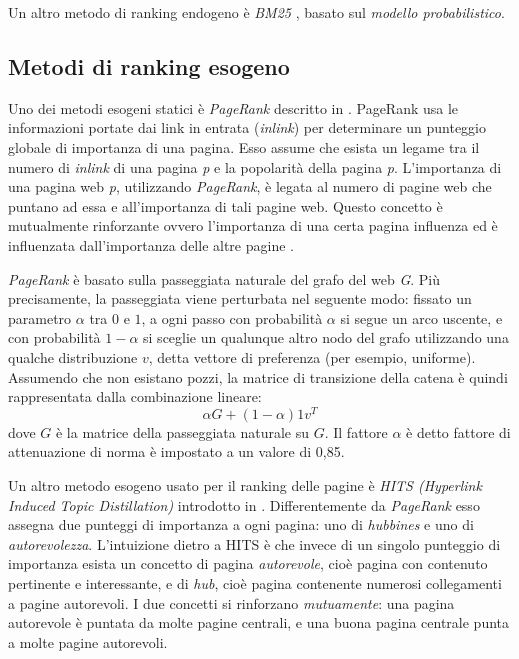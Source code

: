 Un altro metodo di ranking endogeno è \textit{BM25} \cite{Robertson:2009:PRF:1704809.1704810}, basato sul \textit{modello probabilistico}. 

\subsection{Metodi di ranking esogeno}
\label{sub:esogeno}
Uno dei metodi esogeni statici è \textit{PageRank} descritto in \cite{ilprints422}. PageRank usa le informazioni portate dai link in entrata (\textit{inlink}) per determinare un punteggio globale di importanza di una pagina. Esso assume che esista un legame tra il numero di \textit{inlink} di una pagina \textit{p} e la popolarità della pagina \textit{p}. L'importanza di una pagina web \textit{p}, utilizzando \textit{PageRank}, è legata al numero di pagine web che puntano ad essa e all'importanza di tali pagine web. Questo concetto è mutualmente rinforzante ovvero l'importanza di una certa pagina influenza ed è influenzata dall'importanza delle altre pagine \cite{ilprints646}. 

\textit{PageRank} è basato sulla passeggiata naturale del grafo del web \textit{G}. Più precisamente, la passeggiata viene perturbata nel seguente modo: fissato un parametro \(\alpha\) tra \(0\) e \(1\), a ogni passo con probabilità \(\alpha\) si segue un arco uscente, e con probabilità \(1- \alpha \) si sceglie un qualunque altro nodo del grafo utilizzando 
una 
qualche 
distribuzione \(v\), detta
vettore di preferenza (per esempio, uniforme). Assumendo che non esistano pozzi, la matrice di transizione della catena è quindi rappresentata dalla combinazione lineare:
\begin{equation}
 \alpha G + (1 - \alpha) 1 v^T
\end{equation}
dove \(G\) è la matrice della passeggiata naturale su \(G\). Il fattore \(\alpha\) è detto fattore di attenuazione di norma è impostato a un valore di 0,85.

Un altro metodo esogeno usato per il ranking delle pagine è \textit{HITS (Hyperlink Induced Topic Distillation)} introdotto in \cite{Kleinberg:1999:ASH:324133.324140}. Differentemente da \textit{PageRank} esso assegna due punteggi di importanza a ogni pagina: uno di \textit{hubbines} e uno di \textit{autorevolezza}. L’intuizione dietro a HITS è che invece di un singolo punteggio di importanza esista un concetto di pagina \textit{autorevole}, cioè pagina con contenuto pertinente e interessante, e di \textit{hub}, cioè pagina contenente numerosi collegamenti a pagine autorevoli. I due concetti si rinforzano \textit{mutuamente}: una pagina autorevole è puntata da molte pagine centrali, e una buona pagina centrale punta a molte pagine autorevoli.

